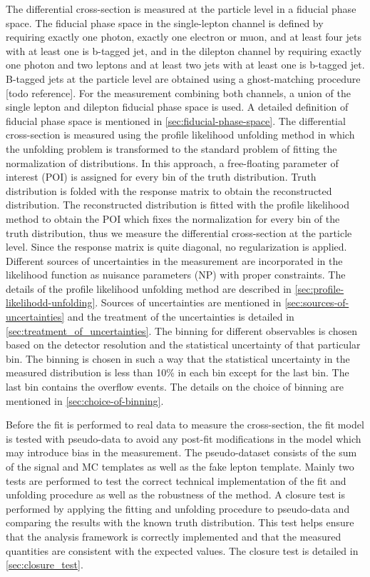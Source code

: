The differential cross-section is measured at the particle level in a fiducial phase space. The fiducial phase space in the single-lepton channel is defined by requiring exactly one photon, exactly one electron or muon, and at least four jets with at least one is b-tagged jet, and in the dilepton channel by requiring exactly one photon and two leptons and at least two jets with at least one is b-tagged jet. B-tagged jets at the particle level are obtained using a ghost-matching procedure [todo reference]. For the measurement combining both channels, a union of the single lepton and dilepton fiducial phase space is used. A detailed definition of fiducial phase space is mentioned in \cref{sec:fiducial-phase-space}. The differential cross-section is measured using the profile likelihood unfolding method in which the unfolding problem is transformed to the standard problem of fitting the normalization of distributions. In this approach, a free-floating parameter of interest (POI) is assigned for every bin of the truth distribution. Truth distribution is folded with the response matrix to obtain the reconstructed distribution. The reconstructed distribution is fitted with the profile likelihood method to obtain the POI which fixes the normalization for every bin of the truth distribution, thus we measure the differential cross-section at the particle level. Since the response matrix is quite diagonal, no regularization is applied. Different sources of uncertainties in the measurement are incorporated in the likelihood function as nuisance parameters (NP) with proper constraints. The details of the profile likelihood unfolding method are described in \cref{sec:profile-likelihodd-unfolding}. Sources of uncertainties are mentioned in \cref{sec:sources-of-uncertainties} and the treatment of the uncertainties is detailed in \cref{sec:treatment_of_uncertainties}. The binning for different observables is chosen based on the detector resolution and the statistical uncertainty of that particular bin. The binning is chosen in such a way that the statistical uncertainty in the measured distribution is less than 10\% in each bin except for the last bin. The last bin contains the overflow events. The details on the choice of binning are mentioned in \cref{sec:choice-of-binning}.

Before the fit is performed to real data to measure the cross-section, the fit model is tested with pseudo-data to avoid any post-fit modifications in the model which may introduce bias in the measurement. The pseudo-dataset consists of the sum of the signal and MC templates as well as the fake lepton template. Mainly two tests are performed to test the correct technical implementation of the fit and unfolding procedure as well as the robustness of the method. A closure test is performed by applying the fitting and unfolding procedure to pseudo-data and comparing the results with the known truth distribution. This test helps ensure that the analysis framework is correctly implemented and that the measured quantities are consistent with the expected values. The closure test is detailed in \cref{sec:closure_test}.

